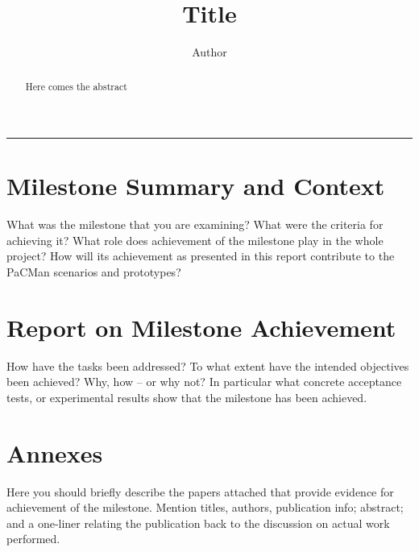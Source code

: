 \documentclass[a4paper,11pt,pdf]{pacmanreport}
\title{Title}
\author{Author}
\begin{document}
\maketitle

\begin{abstract}
\noindent Here comes the abstract
\end{abstract}


\vspace{.2em}
\hrule

\vspace{.2em}
\footnotesize

\tableofcontents

\normalsize

\newpage

\section{Milestone Summary and Context}

What was the milestone that you are examining? What were the criteria for achieving it? What role does achievement of the milestone play in the whole project? How will its achievement as presented in this report contribute to the PaCMan scenarios and prototypes? 


\newpage

\section{Report on Milestone Achievement}

How have the tasks been addressed? To what extent have the intended objectives been achieved? Why, how -- or why not? In particular what concrete acceptance tests, or experimental results show that the milestone has been achieved.


\section{Annexes}

Here you should briefly describe the papers attached that provide evidence for achievement of the milestone. Mention titles, authors, publication info; abstract; and a one-liner relating the publication back to the discussion on actual work performed. 
\end{document}
